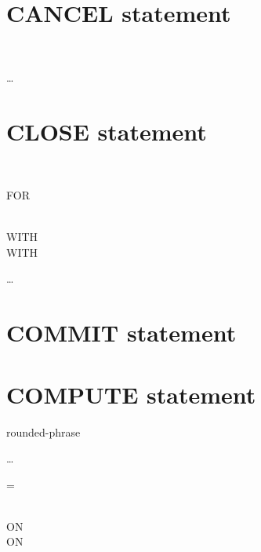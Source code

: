 \section{CANCEL statement}

\begin{1=}
  \identifier \\
  \literal
\end{1=} \ldots

\section{CLOSE statement}

\begin{1=}
  \filename
  \begin{0-1}
    \begin{1=}
       \\
    \end{1=}
    \begin{0-1}
      FOR 
    \end{0-1} \\

    WITH   \\
    WITH 
  \end{0-1}
\end{1=} \ldots

\section{COMMIT statement}


\section{COMPUTE statement}

\begin{1=}
  \identifier
  \begin{0-1}
    rounded-phrase
  \end{0-1}
\end{1=} \ldots
\begin{1=}
  = \\
   \\
\end{1=}
\arithmeticexpression

\begin{0+}
  ON   \imperativestatement \\
   ON   \imperativestatement
\end{0+}

